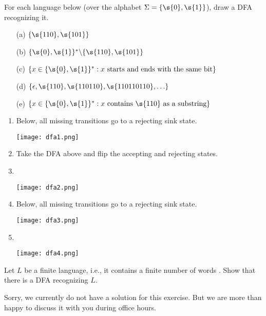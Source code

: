\begin{flex}
\begin{exercise}  \label{exercise:Draw-DFAs}
For each language below (over the alphabet $\Sigma = \{\s{0},\s{1}\}$), draw a DFA recognizing it.
\begin{enumerate}
    \item[(a)] $\{\s{110}, \s{101}\}$ 
    \item[(b)] $\{\s{0},\s{1}\}^* \backslash \{\s{110}, \s{101}\}$
    \item[(c)] $\{x \in \{\s{0},\s{1}\}^* : \text{$x$ starts and ends with the same bit}\}$
    \item[(d)] $\{\epsilon, \s{110}, \s{110110}, \s{110110110}, \ldots\}$
    \item[(e)] $\{x \in \{\s{0},\s{1}\}^*: \text{$x$ contains $\s{110}$ as a substring}\}$
\end{enumerate}
\end{exercise}
\begin{solution}
\begin{enumerate}[label=(\alph*)] 
    \item Below, all missing transitions go to a rejecting sink state.
    \begin{center}
        \texttt{[image: dfa1.png]}
    \end{center}
    \item Take the DFA above and flip the accepting and rejecting states.
    \item \
    \begin{center}
        \texttt{[image: dfa2.png]}
    \end{center}
    \item Below, all missing transitions go to a rejecting sink state.
    \begin{center}
        \texttt{[image: dfa3.png]}
    \end{center}
    \item \
    \begin{center}
        \texttt{[image: dfa4.png]}
    \end{center}
\end{enumerate}
\end{solution}
\end{flex}


\begin{flex}
\begin{exercise}  \label{exercise:Finite-languages-are-regular}
Let $L$ be a finite language, i.e., it contains a finite number of words . Show that there is a DFA recognizing $L$.
\end{exercise}


\begin{solution}
Sorry, we currently do not have a solution for this exercise. But we are more than happy to discuss it with you during office hours.
\end{solution}
\end{flex}


